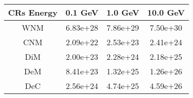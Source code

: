 \documentclass[10pt,a4paper]{article}
\author{Loann Brahimi}
\begin{document}
\begin{tabular}{cccc} 
\hline 
CRs Energy & 0.1 GeV & 1.0 GeV & 10.0 GeV \\
\hline 
WNM & 6.83e+28  & 7.86e+29  & 7.50e+30 \\ 
CNM & 2.09e+22  & 2.53e+23  & 2.41e+24 \\ 
DiM & 2.00e+23  & 2.28e+24  & 2.18e+25 \\ 
DeM & 8.41e+23  & 1.32e+25  & 1.26e+26 \\ 
DeC & 2.56e+24  & 4.74e+25  & 4.59e+26 \\ 
\hline 
\end{tabular}
\end{document}
